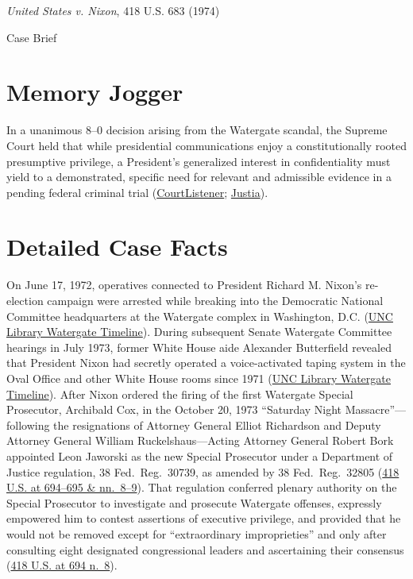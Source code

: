 \documentclass[12pt]{article}
\begin{document}
\begin{center}
{\LARGE \textit{United States v. Nixon}, 418 U.S. 683 (1974)\par}
\vspace{0.8em}
{\large Case Brief\par}
\end{center}
\vspace{1em}

\section{Memory Jogger}

In a unanimous 8--0 decision arising from the Watergate scandal, the Supreme Court held that while presidential communications enjoy a constitutionally rooted presumptive privilege, a President's generalized interest in confidentiality must yield to a demonstrated, specific need for relevant and admissible evidence in a pending federal criminal trial (\href{https://www.courtlistener.com/opinion/109101/united-states-v-nixon/}{CourtListener}; \href{https://supreme.justia.com/cases/federal/us/418/683/}{Justia}).

\section{Detailed Case Facts}

On June 17, 1972, operatives connected to President Richard M. Nixon's re-election campaign were arrested while breaking into the Democratic National Committee headquarters at the Watergate complex in Washington, D.C. (\href{https://exhibits.lib.unc.edu/exhibits/show/watergate/timeline}{UNC Library Watergate Timeline}). During subsequent Senate Watergate Committee hearings in July 1973, former White House aide Alexander Butterfield revealed that President Nixon had secretly operated a voice-activated taping system in the Oval Office and other White House rooms since 1971 (\href{https://exhibits.lib.unc.edu/exhibits/show/watergate/timeline}{UNC Library Watergate Timeline}). After Nixon ordered the firing of the first Watergate Special Prosecutor, Archibald Cox, in the October 20, 1973 ``Saturday Night Massacre''---following the resignations of Attorney General Elliot Richardson and Deputy Attorney General William Ruckelshaus---Acting Attorney General Robert Bork appointed Leon Jaworski as the new Special Prosecutor under a Department of Justice regulation, 38 Fed.\ Reg.\ 30739, as amended by 38 Fed.\ Reg.\ 32805 (\href{https://supreme.justia.com/cases/federal/us/418/683/}{418 U.S. at 694--695 \& nn.\ 8--9}). That regulation conferred plenary authority on the Special Prosecutor to investigate and prosecute Watergate offenses, expressly empowered him to contest assertions of executive privilege, and provided that he would not be removed except for ``extraordinary improprieties'' and only after consulting eight designated congressional leaders and ascertaining their consensus (\href{https://supreme.justia.com/cases/federal/us/418/683/}{418 U.S. at 694 n.\ 8}).
\end{document}
